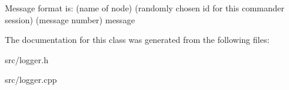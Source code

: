 Message format is\-: (name of node) (randomly chosen id for this commander session) (message number) message 

The documentation for this class was generated from the following files\-:\begin{DoxyCompactItemize}
\item 
src/logger.\-h\item 
src/logger.\-cpp\end{DoxyCompactItemize}
